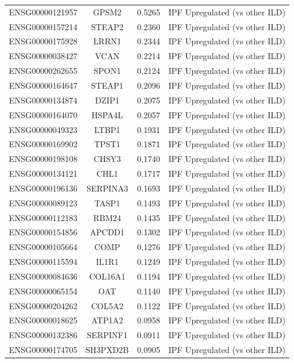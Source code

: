 \documentclass[
]{article}
\begin{document}
\begin{singlespace}
\begin{longtable}[t]{lccc}
\endfoot
\bottomrule
\endlastfoot
ENSG00000121957 & GPSM2 & 0.5265 & IPF Upregulated (vs other ILD)\\
ENSG00000157214 & STEAP2 & 0.2360 & IPF Upregulated (vs other ILD)\\
ENSG00000175928 & LRRN1 & 0.2344 & IPF Upregulated (vs other ILD)\\
ENSG00000038427 & VCAN & 0.2214 & IPF Upregulated (vs other ILD)\\
ENSG00000262655 & SPON1 & 0.2124 & IPF Upregulated (vs other ILD)\\
\addlinespace
ENSG00000164647 & STEAP1 & 0.2096 & IPF Upregulated (vs other ILD)\\
ENSG00000134874 & DZIP1 & 0.2075 & IPF Upregulated (vs other ILD)\\
ENSG00000164070 & HSPA4L & 0.2057 & IPF Upregulated (vs other ILD)\\
ENSG00000049323 & LTBP1 & 0.1931 & IPF Upregulated (vs other ILD)\\
ENSG00000169902 & TPST1 & 0.1871 & IPF Upregulated (vs other ILD)\\
\addlinespace
ENSG00000198108 & CHSY3 & 0.1740 & IPF Upregulated (vs other ILD)\\
ENSG00000134121 & CHL1 & 0.1717 & IPF Upregulated (vs other ILD)\\
ENSG00000196136 & SERPINA3 & 0.1693 & IPF Upregulated (vs other ILD)\\
ENSG00000089123 & TASP1 & 0.1493 & IPF Upregulated (vs other ILD)\\
ENSG00000112183 & RBM24 & 0.1435 & IPF Upregulated (vs other ILD)\\
\addlinespace
ENSG00000154856 & APCDD1 & 0.1302 & IPF Upregulated (vs other ILD)\\
ENSG00000105664 & COMP & 0.1276 & IPF Upregulated (vs other ILD)\\
ENSG00000115594 & IL1R1 & 0.1249 & IPF Upregulated (vs other ILD)\\
ENSG00000084636 & COL16A1 & 0.1194 & IPF Upregulated (vs other ILD)\\
ENSG00000065154 & OAT & 0.1140 & IPF Upregulated (vs other ILD)\\
\addlinespace
ENSG00000204262 & COL5A2 & 0.1122 & IPF Upregulated (vs other ILD)\\
ENSG00000018625 & ATP1A2 & 0.0958 & IPF Upregulated (vs other ILD)\\
ENSG00000132386 & SERPINF1 & 0.0911 & IPF Upregulated (vs other ILD)\\
ENSG00000174705 & SH3PXD2B & 0.0905 & IPF Upregulated (vs other ILD)\\

\end{longtable}
\end{singlespace}
\end{document}
